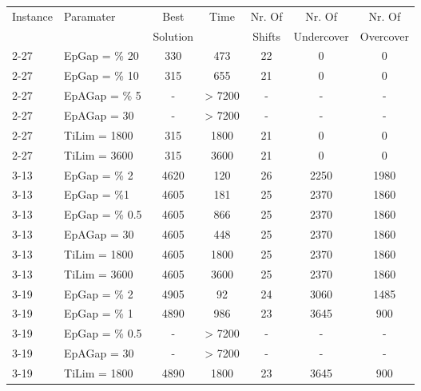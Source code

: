 \begin{table} \small
\centering
\begin{tabular}{llccccc}
\hline
 Instance & Paramater & Best & Time & Nr. Of & Nr. Of  & Nr. Of   \\
 &  & Solution &  & Shifts & Undercover & Overcover \\
\hline
2-27 &  EpGap =  \% 20	& 330 		& 473	&  22 & 0 & 0  \\

2-27 &  EpGap = \% 10	& 315 		& 655	&  21 & 0 & 0  \\

2-27 &  EpAGap = 	\% 5   & -		& > 7200	&  - & - & -   \\

2-27 &  EpAGap =  30	& -		& > 7200	&  - & - & -   \\

2-27 &  TiLim = 1800	& 315 		&  1800	&  21	&  0 & 0 \\

2-27 &  TiLim = 3600	 & 315 	&  3600	&  21	&  0 & 0 \\

3-13 &  EpGap = \% 2	& 4620 	& 120 & 26 & 2250  & 1980 \\

3-13 &  EpGap = \%1	& 4605 	& 181 & 25 & 2370  & 1860 \\

3-13 &  EpGap =  \% 0.5 	& 4605	& 866 & 25 & 2370  & 1860 \\

3-13 &  EpAGap = 30  	& 4605	& 448 & 25 & 2370  & 1860 \\

3-13 &  TiLim =  1800	& 4605	& 1800 & 25 & 2370  & 1860 \\

3-13 &  TiLim = 3600	 & 4605	& 3600 & 25 & 2370  & 1860 \\

3-19 &  EpGap =   \% 2 	& 4905 & 92 & 24 & 3060  & 1485 \\

3-19 &  EpGap =  \% 1  	& 4890 & 986 & 23 & 3645  & 900 \\

3-19 &  EpGap =   \% 0.5 	& - & > 7200 & - & -  & - \\

3-19 &  EpAGap = 30  	& - & > 7200 & - & -  & - \\

3-19 &  TiLim =  1800	& 4890 & 1800 & 23 & 3645  & 900  \\


\end{tabular}
\end{table}
